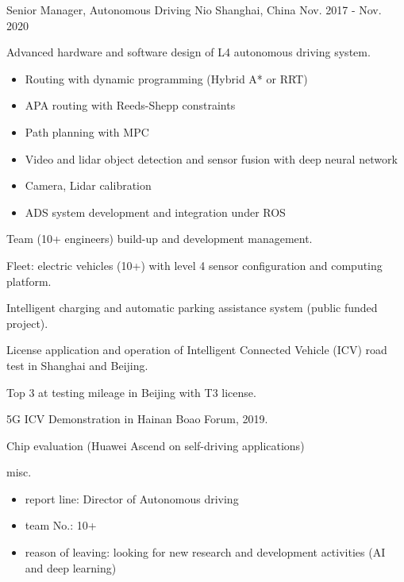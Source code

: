 \documentclass[../cv.tex]{subfiles}
\begin{document}
\begin{cventries}
	\cventry
	{Senior Manager, Autonomous Driving} %
	{Nio} %
	{Shanghai, China} %
	{Nov. 2017 - Nov. 2020} %
	{
		\begin{cvitems}
			\item Advanced hardware and software design of L4 autonomous driving system.
			\begin{itemize}
				\item Routing with dynamic programming (Hybrid A* or RRT)
				\item APA routing with Reeds-Shepp constraints
				\item Path planning with MPC
				\item Video and lidar object detection and sensor fusion with deep neural network
				\item Camera, Lidar calibration
				\item ADS system development and integration under ROS
			\end{itemize}
			\item Team (10+ engineers) build-up and development management.
			\item Fleet: electric vehicles (10+) with level 4 sensor configuration and computing platform.
			\item Intelligent charging and automatic parking assistance system (public funded project).
			\item License application and operation of Intelligent Connected Vehicle (ICV) road test in Shanghai and Beijing.
			\item Top 3 at testing mileage in Beijing with T3 license.
			\item 5G ICV Demonstration in Hainan Boao Forum, 2019.
			\item Chip evaluation (Huawei Ascend on self-driving applications)
			\item misc.
			\begin{itemize}
				\item report line: Director of Autonomous driving
				\item team No.: 10+
				\item reason of leaving: looking for new research and development activities (AI and deep learning)
			\end{itemize}
		\end{cvitems}
	}


\end{cventries}
\end{document}
